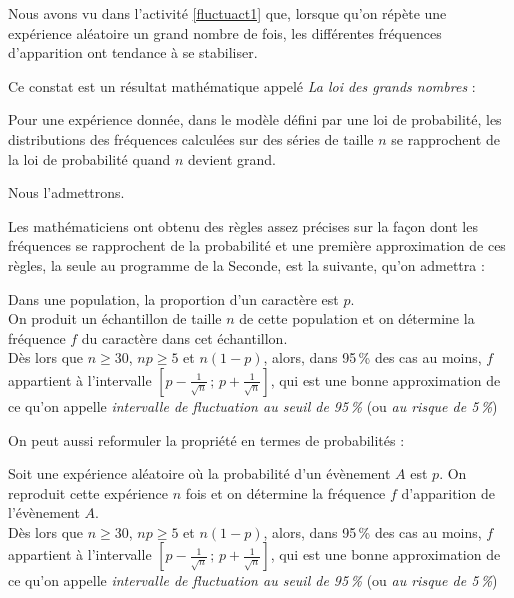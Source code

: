  Nous avons vu dans l'activit\'e \ref{fluctuact1} que, lorsque qu'on r\'ep\`ete une exp\'erience al\'eatoire un grand nombre de fois, les diff\'erentes fr\'equences d'apparition ont tendance \`a se stabiliser.
 
Ce constat est un r\'esultat math\'ematique appel\'e \emph{La loi des grands nombres} :

\begin{theo}
Pour une exp\'erience donn\'ee, dans le mod\`ele d\'efini par une loi de probabilit\'e, les distributions des fr\'equences calcul\'ees sur des s\'eries de taille $n$ se
rapprochent de la loi de probabilit\'e quand $n$ devient grand.
\end{theo}

Nous l'admettrons.

Les math\'ematiciens ont obtenu des r\`egles assez pr\'ecises sur la fa\c con dont les fr\'equences se rapprochent de la probabilit\'e et une premi\`ere approximation de ces r\`egles, la seule au programme de la Seconde, est la suivante, qu'on admettra :


  \begin{prop*}
   Dans une population, la proportion d'un caract\`ere est $p$.\\
   On produit un \'echantillon de taille $n$ de cette population et on d\'etermine la fr\'equence $f$ du caract\`ere dans cet \'echantillon.\\
   D\`es lors que $n\geqslant 30$, $np\geqslant 5$ et $n(1-p)$, alors, dans 95\,\% des cas au moins, $f$ appartient \`a l'intervalle $\left[p-\frac{1}{\sqrt{n}}\,;\,p+\frac{1}{\sqrt{n}}\right]$, qui est une bonne approximation de ce qu'on appelle \emph{intervalle de fluctuation au seuil de 95\,\%} (ou \emph{au risque de 5\,\%})
  \end{prop*}
  
  On peut aussi reformuler la propri\'et\'e en termes de probabilit\'es :
  
  \begin{prop}
   Soit une exp\'erience al\'eatoire o\`u la probabilit\'e d'un \'ev\`enement $A$ est $p$. On reproduit cette exp\'erience $n$ fois et on d\'etermine la fr\'equence $f$ d'apparition de l'\'ev\`enement $A$.\\
    D\`es lors que $n\geqslant 30$, $np\geqslant 5$ et $n(1-p)$, alors, dans 95\,\% des cas au moins, $f$ appartient \`a l'intervalle $\left[p-\frac{1}{\sqrt{n}}\,;\,p+\frac{1}{\sqrt{n}}\right]$, qui est une bonne approximation de ce qu'on appelle \emph{intervalle de fluctuation au seuil de 95\,\%} (ou \emph{au risque de 5\,\%})
  \end{prop}

